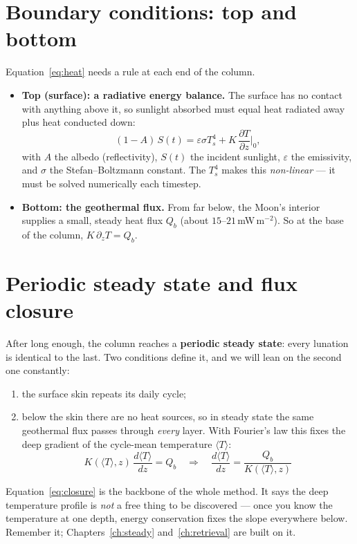 \documentclass[11pt]{report}
\newcommand{\Tm}{\langle T\rangle}
\begin{document}
\section{Boundary conditions: top and bottom}
Equation~\eqref{eq:heat} needs a rule at each end of the column.
\begin{itemize}[leftmargin=1.4em,itemsep=2pt]
\item \textbf{Top (surface): a radiative energy balance.} The surface has no
contact with anything above it, so sunlight absorbed must equal heat radiated
away plus heat conducted down:
\begin{equation}
(1-A)\,S(t) = \varepsilon\sigma T_s^4 + K\,\frac{\partial T}{\partial z}\Big|_{0},
\label{eq:surfbc}
\end{equation}
with $A$ the albedo (reflectivity), $S(t)$ the incident sunlight, $\varepsilon$
the emissivity, and $\sigma$ the Stefan--Boltzmann constant. The $T_s^4$ makes
this \emph{non-linear} --- it must be solved numerically each timestep.
\item \textbf{Bottom: the geothermal flux.} From far below, the Moon's interior
supplies a small, steady heat flux $Q_b$ (about $15$--$21$\,mW\,m$^{-2}$). So at
the base of the column, $K\,\partial_z T = Q_b$.
\end{itemize}

\section{Periodic steady state and flux closure}\label{sec:fluxclosure}
After long enough, the column reaches a \textbf{periodic steady state}: every
lunation is identical to the last. Two conditions define it, and we will lean on
the second one constantly:
\begin{enumerate}[leftmargin=1.5em,itemsep=2pt]
\item the surface skin repeats its daily cycle;
\item below the skin there are no heat sources, so in steady state the same
geothermal flux passes through \emph{every} layer. With Fourier's law this fixes
the deep gradient of the cycle-mean temperature $\Tm$:
\begin{equation}
\boxed{\;K(\Tm,z)\,\frac{d\Tm}{dz}=Q_b
\quad\Longrightarrow\quad
\frac{d\Tm}{dz}=\frac{Q_b}{K(\Tm,z)}\;}
\label{eq:closure}
\end{equation}
\end{enumerate}

\begin{keypt}
Equation~\eqref{eq:closure} is the backbone of the whole method. It says the deep
temperature profile is \emph{not} a free thing to be discovered --- once you know
the temperature at one depth, energy conservation fixes the slope everywhere
below. Remember it; Chapters~\ref{ch:steady} and~\ref{ch:retrieval} are built on
it.
\end{keypt}
\end{document}
